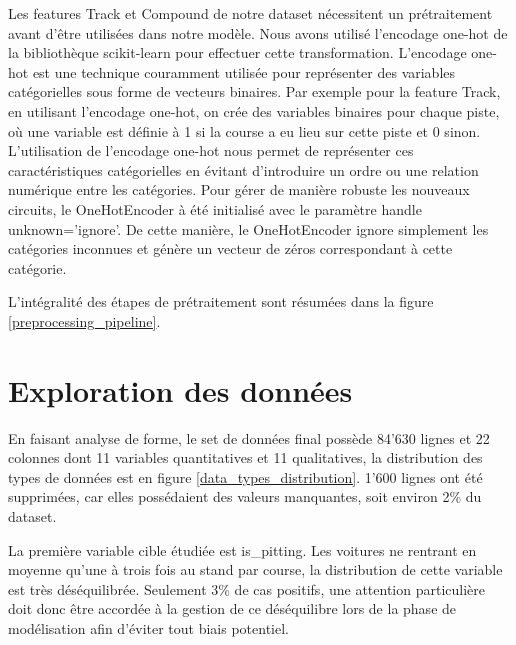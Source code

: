 Les features Track et Compound de notre dataset nécessitent un prétraitement avant d'être utilisées dans notre modèle. Nous avons utilisé l'encodage one-hot de la bibliothèque scikit-learn pour effectuer cette transformation.
L'encodage one-hot est une technique couramment utilisée pour représenter des variables catégorielles sous forme de vecteurs binaires.
Par exemple pour la feature Track, en utilisant l'encodage one-hot, on crée des variables binaires pour chaque piste, où une variable est définie à 1 si la course a eu lieu sur cette piste et 0 sinon.
L'utilisation de l'encodage one-hot nous permet de représenter ces caractéristiques catégorielles en évitant d'introduire un ordre ou une relation numérique entre les catégories.
Pour gérer de manière robuste les nouveaux circuits, le OneHotEncoder à été initialisé avec le paramètre handle unknown='ignore'.
De cette manière, le OneHotEncoder ignore simplement les catégories inconnues et génère un vecteur de zéros correspondant à cette catégorie.

L'intégralité des étapes de prétraitement sont résumées dans la figure \ref{preprocessing_pipeline}.

\section{Exploration des données}
En faisant analyse de forme, le set de données final possède 84'630 lignes et 22 colonnes dont 11 variables quantitatives et 11 qualitatives, la distribution des types de données est en figure \ref{data_types_distribution}.
1'600 lignes ont été supprimées, car elles possédaient des valeurs manquantes, soit environ 2\% du dataset.

La première variable cible étudiée est is\_pitting. Les voitures ne rentrant en moyenne qu'une à trois fois au stand par course, la distribution de cette variable est très déséquilibrée.
Seulement 3\% de cas positifs, une attention particulière doit donc être accordée à la gestion de ce déséquilibre
lors de la phase de modélisation afin d'éviter tout biais potentiel.

